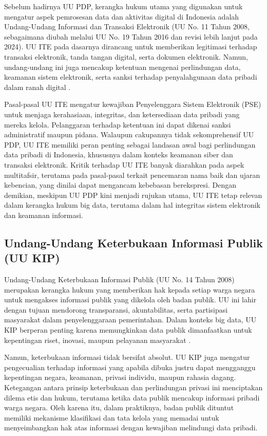 Sebelum hadirnya UU PDP, kerangka hukum utama yang digunakan untuk mengatur aspek pemrosesan data dan aktivitas digital di Indonesia adalah Undang-Undang Informasi dan Transaksi Elektronik (UU No. 11 Tahun 2008, sebagaimana diubah melalui UU No. 19 Tahun 2016 dan revisi lebih lanjut pada 2024). UU ITE pada dasarnya dirancang untuk memberikan legitimasi terhadap transaksi elektronik, tanda tangan digital, serta dokumen elektronik. Namun, undang-undang ini juga mencakup ketentuan mengenai perlindungan data, keamanan sistem elektronik, serta sanksi terhadap penyalahgunaan data pribadi dalam ranah digital \cite{ite2008}. 

Pasal-pasal UU ITE mengatur kewajiban Penyelenggara Sistem Elektronik (PSE) untuk menjaga kerahasiaan, integritas, dan ketersediaan data pribadi yang mereka kelola. Pelanggaran terhadap ketentuan ini dapat dikenai sanksi administratif maupun pidana. Walaupun cakupannya tidak sekomprehensif UU PDP, UU ITE memiliki peran penting sebagai landasan awal bagi perlindungan data pribadi di Indonesia, khususnya dalam konteks keamanan siber dan transaksi elektronik. Kritik terhadap UU ITE banyak diarahkan pada aspek multitafsir, terutama pada pasal-pasal terkait pencemaran nama baik dan ujaran kebencian, yang dinilai dapat mengancam kebebasan berekspresi. Dengan demikian, meskipun UU PDP kini menjadi rujukan utama, UU ITE tetap relevan dalam kerangka hukum big data, terutama dalam hal integritas sistem elektronik dan keamanan informasi.

\subsection{Undang-Undang Keterbukaan Informasi Publik (UU KIP)}

Undang-Undang Keterbukaan Informasi Publik (UU No. 14 Tahun 2008) merupakan kerangka hukum yang memberikan hak kepada setiap warga negara untuk mengakses informasi publik yang dikelola oleh badan publik. UU ini lahir dengan tujuan mendorong transparansi, akuntabilitas, serta partisipasi masyarakat dalam penyelenggaraan pemerintahan. Dalam konteks big data, UU KIP berperan penting karena memungkinkan data publik dimanfaatkan untuk kepentingan riset, inovasi, maupun pelayanan masyarakat \cite{kip2008}.  

Namun, keterbukaan informasi tidak bersifat absolut. UU KIP juga mengatur pengecualian terhadap informasi yang apabila dibuka justru dapat mengganggu kepentingan negara, keamanan, privasi individu, maupun rahasia dagang. Ketegangan antara prinsip keterbukaan dan perlindungan privasi ini menciptakan dilema etis dan hukum, terutama ketika data publik mencakup informasi pribadi warga negara. Oleh karena itu, dalam praktiknya, badan publik dituntut memiliki mekanisme klasifikasi dan tata kelola yang memadai untuk menyeimbangkan hak atas informasi dengan kewajiban melindungi data pribadi.


